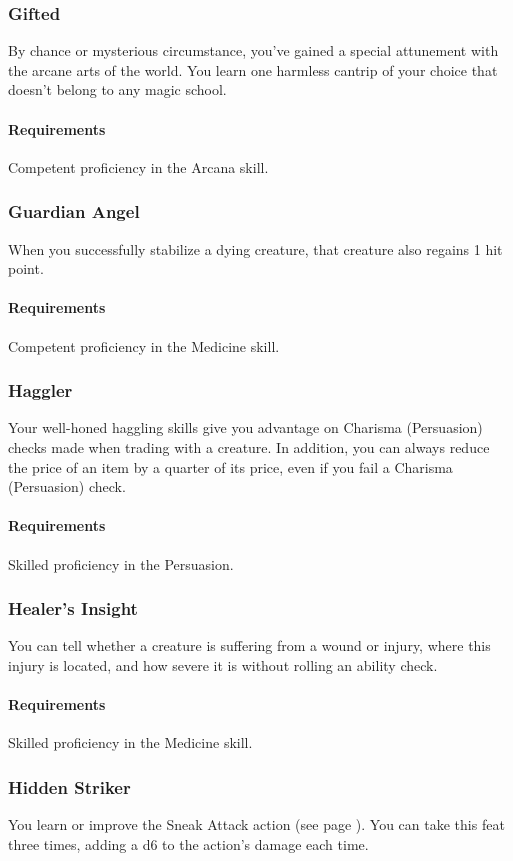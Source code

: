\subsubsection{Gifted} \label{feat::gifted}
    By chance or mysterious circumstance, you've gained a special attunement with the arcane arts of the world.
    You learn one harmless cantrip of your choice that doesn't belong to any magic school.
    \paragraph{Requirements} Competent proficiency in the Arcana skill.
\subsubsection{Guardian Angel} \label{feat::guardianangel}
    When you successfully stabilize a dying creature, that creature also regains 1 hit point.
    \paragraph{Requirements} Competent proficiency in the Medicine skill.
\subsubsection{Haggler} \label{feat::haggler}
    Your well-honed haggling skills give you advantage on Charisma (Persuasion) checks made when trading with a creature.
    In addition, you can always reduce the price of an item by a quarter of its price, even if you fail a Charisma (Persuasion) check.
    \paragraph{Requirements} Skilled proficiency in the Persuasion.
\subsubsection{Healer's Insight} \label{feat::healersinsight}
    You can tell whether a creature is suffering from a wound or injury, where this injury is located, and how severe it is without rolling an ability check.
    \paragraph{Requirements} Skilled proficiency in the Medicine skill.
\subsubsection{Hidden Striker} \label{feat::hiddenstriker}
    You learn or improve the Sneak Attack action (see page \pageref{act::sneakattack}).
    You can take this feat three times, adding a d6 to the action's damage each time.
